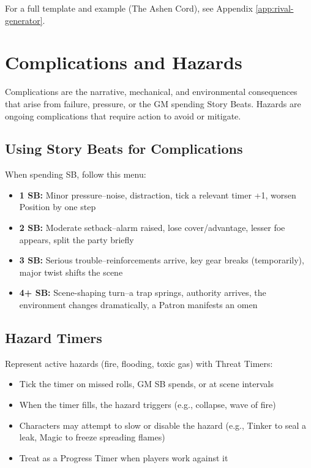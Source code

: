 For a full template and example (The Ashen Cord), see Appendix \ref{app:rival-generator}.

\section{Complications and Hazards}

Complications are the narrative, mechanical, and environmental consequences that arise from failure, pressure, or the GM spending Story Beats. Hazards are ongoing complications that require action to avoid or mitigate.

\subsection{Using Story Beats for Complications}
When spending SB, follow this menu:
\begin{itemize}
  \item \textbf{1 SB:} Minor pressure--noise, distraction, tick a relevant timer +1, worsen Position by one step
  \item \textbf{2 SB:} Moderate setback--alarm raised, lose cover/advantage, lesser foe appears, split the party briefly
  \item \textbf{3 SB:} Serious trouble--reinforcements arrive, key gear breaks (temporarily), major twist shifts the scene
  \item \textbf{4+ SB:} Scene-shaping turn--a trap springs, authority arrives, the environment changes dramatically, a Patron manifests an omen
\end{itemize}

\subsection{Hazard Timers}
Represent active hazards (fire, flooding, toxic gas) with Threat Timers:
\begin{itemize}
  \item Tick the timer on missed rolls, GM SB spends, or at scene intervals
  \item When the timer fills, the hazard triggers (e.g., collapse, wave of fire)
  \item Characters may attempt to slow or disable the hazard (e.g., Tinker to seal a leak, Magic to freeze spreading flames)
  \item Treat as a Progress Timer when players work against it
\end{itemize}

